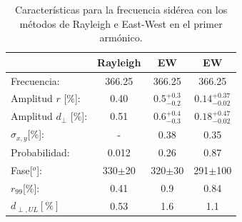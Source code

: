 \documentclass[11pt,papel,oneside,singlespace]{ibtesis}
\begin{document}
    \begin{table}[H]
        \begin{small}
            \begin{center}
                \begin{tabular}[c]{l|c||c|c}
                                            & Rayleigh    & EW                          & EW\cite{Aab_2020}      \\\hline
                    Frecuencia:             & 366.25	  & 366.25                      & 366.25        \\
                    Amplitud $r$ [\%]:      & 0.40	      & $0.5^{+0.3}_{-0.2}$         & $0.14^{+0.37}_{-0.02}$\cite{codigo}       \\
                    Amplitud $d_\perp$ [\%]:& 0.51        & $0.6^{+0.4}_{-0.3}$         & $0.18^{+0.47}_{-0.02}$       \\ 
                    $\sigma_{x,y}$[\%]:     & -	          & 0.38	                    & 0.35          \\
                    Probabilidad:           & 0.012	      & 0.26                        & 0.87          \\
                    Fase[$^o$]:             & 330$\pm$20  & 320$\pm$30                  & 291$\pm$100 \cite{discrepancia}      \\
                    $r_{99}$[\%]:           & 0.41	      & 0.9                         & 0.84\cite{codigo}        \\
                    $d_{\perp,UL}[\%]$      & 0.53        & 1.6                         & 1.1        \\
                \end{tabular}
            \end{center}
        \end{small}
        \caption{Características para la frecuencia sidérea con los métodos de Rayleigh  e East-West en el primer armónico.}
        \label{tab:siderea_3}
    \end{table}
   
\end{document}
